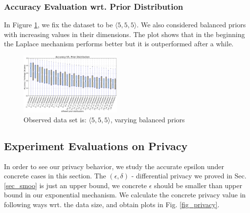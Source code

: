 \documentclass[sigconf, anonymous]{acmart}
\begin{document}
\subsubsection{Accuracy Evaluation wrt. Prior Distribution}
\label{subsubsec_vs_prior}
In Figure \ref{fig_vs_prior}, we fix the dataset to be $\langle 5,5,5\rangle$.
We also considered balanced priors with increasing values in their dimensions.
The plot shows that in the beginning the Laplace mechanism performs better but
it is outperformed after a while.
\begin{figure}[ht]
\centering
\includegraphics[width=0.45\textwidth]{accuracy_vs_prior_5_5_5.eps}
\caption{Observed data set is: $\langle 5,5,5\rangle$, varying balanced priors}
\label{fig_vs_prior}
\end{figure}





\subsection{Experiment Evaluations on Privacy}
\label{subsec_experiment_privacy}
In order to see our privacy behavior, we study the accurate epsilon under concrete cases in this section. The $(\epsilon, \delta)$ - differential privacy we proved in Sec. \ref{sec_smoo} is just an upper bound, we concrete $\epsilon$ should be smaller than upper bound in our exponential mechanism. We calculate the concrete privacy value in following ways wrt. the data size, and obtain plots in Fig. \ref{fig_privacy}.
\end{document}
